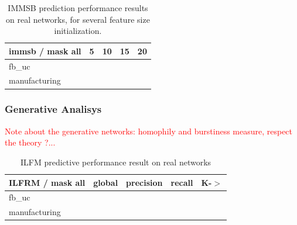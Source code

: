 
\begin{table} \label{table:real1}
    \caption{IMMSB prediction performance results on real networks, for several feature size initialization.}
\begin{tabular}{lrrrr}
\hline                                                                             
 immsb / mask all   &        5 &       10 &       15 &       20 \\                 
\hline                                                                             
fb\_uc & & & & \\
manufacturing  & & & & \\
\hline                                                                             
\end{tabular}  
\end{table}

\subsubsection{Generative Analisys}

\textcolor{red}{Note about the generative networks: homophily and burstiness measure, respect the theory ?...}
 

\begin{table} \label{table:real2}
    \caption{ILFM predictive performance result on real networks}
\begin{tabular}{lrrrr}
\hline
 ILFRM / mask all   &     global &   precision &      recall &   K-\ensuremath{>} \\
\hline
fb\_uc& & & & \\
manufacturing  & & & & \\
\hline
\end{tabular}  
\end{table}

